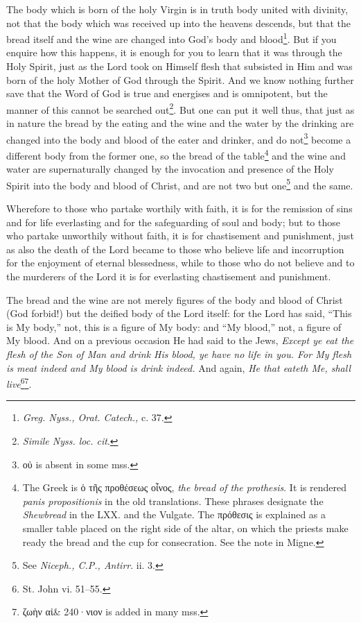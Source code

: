 The body which is born of the holy Virgin is in truth body united with divinity, not that the body which was received up into the heavens descends, but that the bread itself and the wine are changed into God’s body and blood\footnote{\emph{Greg. Nyss., Orat. Catech., }c. 37.}. But if you enquire how this happens, it is enough for you to learn that it was through the Holy Spirit, just as the Lord took on Himself flesh that subsisted in Him and was born of the holy Mother of God through the Spirit. And we know nothing further save that the Word of God is true and energises and is omnipotent, but the manner of this cannot be searched out\footnote{\emph{Simile Nyss. loc. cit}.}. But one can put it well thus, that just as in nature the bread by the eating and the wine and the water by the drinking are changed into the body and blood of the eater and drinker, and do not\footnote{\textgreek{οὐ} is absent in some mss.} become a different body from the former one, so the bread of the table\footnote{The Greek is \textgreek{ὁ τῆς προθέσεως οἶνος}, \emph{the bread of the prothesis}. It is rendered \emph{panis propositionis }in the old translations. These phrases designate the \emph{Shewbread }in the LXX. and the Vulgate. The \textgreek{πρόθεσις} is explained as a smaller table placed on the right side of the altar, on which the priests make ready the bread and the cup for consecration. See the note in Migne.} and the wine and water are supernaturally changed by the invocation and presence of the Holy Spirit into the body and blood of Christ, and are not two but one\footnote{See \emph{Niceph., C.P., Antirr}. ii. 3.} and the same.

Wherefore to those who partake worthily with faith, it is for the remission of sins and for life everlasting and for the safeguarding of soul and body; but to those who partake unworthily without faith, it is for chastisement and punishment, just as also the death of the Lord became to those who believe life and incorruption for the enjoyment of eternal blessedness, while to those who do not believe and to the murderers of the Lord it is for everlasting chastisement and punishment.

The bread and the wine are not merely figures of the body and blood of Christ (God forbid!) but the deified body of the Lord itself: for the Lord has said, “This is My body,” not, this is a figure of My body: and “My blood,” not, a figure of My blood. And on a previous occasion He had said to the Jews, \emph{Except ye eat the flesh of the Son of Man and drink His blood, ye have no life in you. For My flesh is meat indeed and My blood is drink indeed. }And again, \emph{He that eateth Me, shall live}\footnote{St. John vi. 51–55.}\textsuperscript{}\footnote{\textgreek{ζωὴν αἰ\& 240·νιον} is added in many mss.}\textsuperscript{}.

